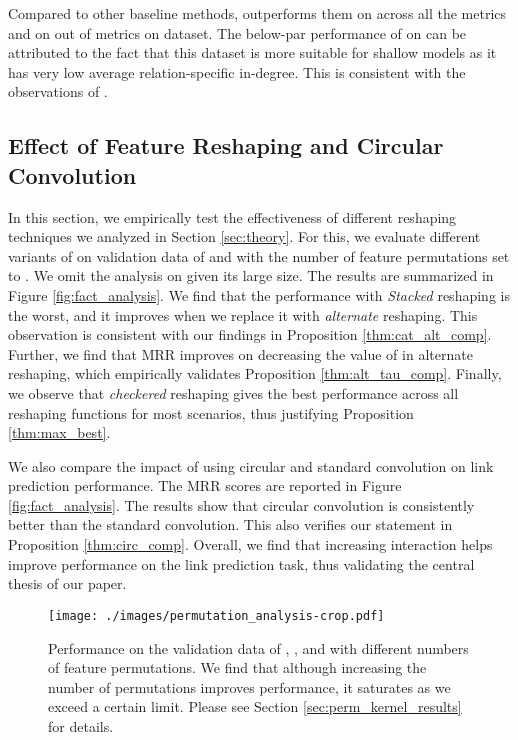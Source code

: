 \documentclass[11pt,a4paper]{article}
\begin{document}
Compared to other baseline methods, \method{} outperforms them on \datafbn{} across all the metrics and on  out of  metrics on \datayago{} dataset. The below-par performance of \method{} on \datawnn{} can be attributed to the fact that this dataset is more suitable for shallow models as it has very low average relation-specific in-degree. This is consistent with the observations of \citet{conve}.


\subsection{Effect of Feature Reshaping and Circular Convolution}
\label{sec:ablation_results}

In this section, we empirically test the effectiveness of different reshaping techniques we analyzed in Section \ref{sec:theory}. For this, we evaluate different variants of \method{}  on validation data of \datafbn{} and \datawnn{} with the number of feature permutations set to . We omit the analysis on \datayago{} given its large size. The results are summarized in Figure \ref{fig:fact_analysis}. We find that the performance with \textit{Stacked} reshaping is the worst, and it improves when we replace it with \textit{alternate} reshaping. This observation is consistent with our findings in Proposition \ref{thm:cat_alt_comp}. Further, we find that MRR improves on decreasing the value of  in alternate reshaping, which empirically validates Proposition \ref{thm:alt_tau_comp}. Finally, we observe that \textit{checkered} reshaping gives the best performance across all reshaping functions for most scenarios, thus justifying Proposition \ref{thm:max_best}.

We also compare the impact of using circular and standard convolution on link prediction performance. The MRR scores are reported in Figure \ref{fig:fact_analysis}. The results show that circular convolution is consistently better than the standard convolution. This also verifies our statement in Proposition \ref{thm:circ_comp}. Overall, we find that increasing interaction helps improve performance on the link prediction task, thus validating the central thesis of our paper.

\begin{figure}[t]
	\centering
	\texttt{[image: ./images/permutation\_analysis-crop.pdf]}
	\caption{\label{fig:perm_analysis}Performance  on the validation data of \datafbn{}, \datawnn{}, and \datayago{} with different numbers of feature permutations.  We find that although increasing the number of permutations improves performance, it saturates as we exceed a certain limit. Please see Section \ref{sec:perm_kernel_results} for details.}
\end{figure}
\end{document}
